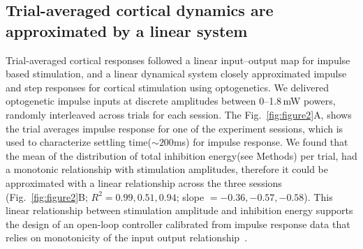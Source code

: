 \subsection*{Trial-averaged cortical dynamics are approximated by a linear system}
Trial-averaged cortical responses followed a linear input--output map for impulse based stimulation, and a linear dynamical system closely approximated impulse and step responses for cortical stimulation using optogenetics. 
We delivered optogenetic impulse inputs at discrete amplitudes between 0--1.8\,mW powers, randomly interleaved across trials for each session. The Fig.~\ref{fig:figure2}A, shows the trial averages impulse response for one of the experiment sessions, which is used to characterize settling time($\sim200$ms) for impulse response.
We found that the mean of the distribution of total inhibition energy(see Methods) per trial, had a monotonic relationship with stimulation amplitudes, therefore it could be approximated with a linear relationship across the three sessions (Fig.~\ref{fig:figure2}B; $R^{2} = 0.99, 0.51, 0.94$; slope $= -0.36, -0.57, -0.58$). This linear relationship between stimulation amplitude and inhibition energy supports the design of an open-loop controller calibrated from impulse response data that relies on monotonicity of the input output relationship~\citep{astrom1995pid}.

